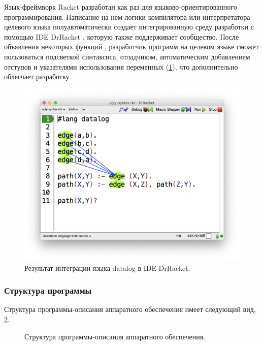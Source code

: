 Язык-фреймворк Racket \cite{racket-lang} разработан как раз для языково-ориентированного
программирования. Написание на нем логики компилятора или интерпретатора целевого языка
полуавтоматически создает интегрированную среду разработки с помощью IDE DrRacket \cite{drracket}, которую
также поддерживает сообщество.
После объявления некоторых функций \cite{racket-drracket-integration}, разработчик программ
на целевом языке сможет пользоваться подсветкой синтаксиса, отладчиком, автоматическим добавлением
отступов и указателями использования переменных (\cref{fig:racket-variable-arrow}), что дополнительно облегчает разработку.

\begin{figure}[!htbp]
    \centering
    \begin{adjustbox}{max totalsize={0.8\textwidth}{\textheight}}
        \includegraphics[]{images/racket-variable-arrow.png}
    \end{adjustbox}
    \caption{Результат интеграции языка datalog в IDE DrRacket.}\label{fig:racket-variable-arrow}
\end{figure}


\subsubsection{Структура программы}\label{sec:ch2/sec1/sub1/sub1}

Структура программы-описания аппаратного обеспечения имеет следующий вид, \cref{fig:device-program-structure}.

\begin{figure}[!htbp]
    \centering
    
    \caption{Структура программы-описания аппаратного обеспечения.}\label{fig:device-program-structure}
\end{figure}

